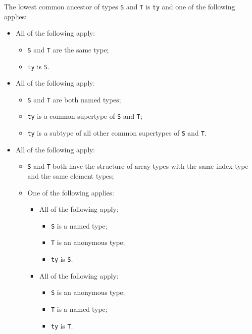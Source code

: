 \documentclass{book}
\begin{document}
  The lowest common ancestor of types \texttt{S} and \texttt{T} is \texttt{ty} and one of the following applies:
  \begin{itemize}
  \item All of the following apply:
    \begin{itemize}
    \item \texttt{S} and \texttt{T} are the same type;
    \item \texttt{ty} is \texttt{S}.
    \end{itemize}

  \item All of the following apply:
    \begin{itemize}
    \item \texttt{S} and \texttt{T} are both named types;
    \item \texttt{ty} is a common supertype of \texttt{S} and \texttt{T};
    \item \texttt{ty} is a subtype of all other common supertypes of \texttt{S} and \texttt{T}.
    \end{itemize}

  \item All of the following apply:
    \begin{itemize}
    \item \texttt{S} and \texttt{T} both have the structure of array types with the same index type
      and the same element types;

    \item One of the following applies:
      \begin{itemize}
      \item All of the following apply:
        \begin{itemize}
        \item \texttt{S} is a named type;
        \item \texttt{T} is an anonymous type;
        \item \texttt{ty} is \texttt{S}.
        \end{itemize}

      \item All of the following apply:
        \begin{itemize}
        \item \texttt{S} is an anonymous type;
        \item \texttt{T} is a named type;
        \item \texttt{ty} is \texttt{T}.
        \end{itemize}
      \end{itemize}
    \end{itemize}


\end{itemize}
\end{document}
